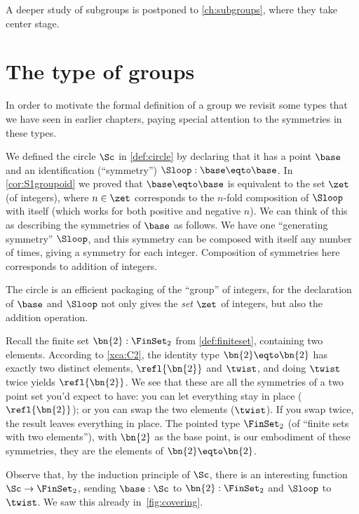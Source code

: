 A deeper study of subgroups is postponed to \cref{ch:subgroups},
where they take center stage.

\section{The type of groups}
\label{sec:typegroup}

In order to motivate the formal definition of a group we
revisit some types that we have seen in earlier chapters,
paying special attention to the symmetries in these types.
\begin{example}\label{ex:base=base}
  We defined the circle $\Sc$ in \cref{def:circle} by declaring
  that it has a point $\base$ and an identification (``symmetry'')
  $\Sloop:\base\eqto\base$.
  In \cref{cor:S1groupoid} we proved that $\base\eqto\base$ is equivalent
  to the set $\zet$ (of integers),
  where $n\in\zet$ corresponds to the $n$-fold composition of $\Sloop$ with itself
  (which works for both positive and negative $n$).
  We can think of this as describing the symmetries of $\base$ as follows.
  We have one ``generating symmetry'' $\Sloop$,
  and this symmetry can be composed with itself any number of times,
  giving a symmetry for each integer.
  Composition of symmetries here corresponds to addition of integers.

  The circle is an efficient packaging of the ``{group}'' of integers, 
  for the declaration of $\base$ and $\Sloop$ not only gives the \emph{set}
  $\zet$ of integers, but also the addition operation.
\end{example}
\begin{example}
  Recall the finite set $\bn{2}:\FinSet_2$ from \cref{def:finiteset},
  containing two elements.
  According to \cref{xca:C2}, the identity type $\bn{2} \eqto \bn{2}$ 
  has exactly two distinct elements, $\refl{\bn{2}}$ and $\twist$,
  and doing $\twist$ twice yields $\refl{\bn{2}}$.
  We see that these are all the symmetries
  of a two point set you'd expect to have:
  you can let everything stay in place ($\refl{\bn{2}}$);
  or you can swap the two elements ($\twist$).
  If you swap twice, the result leaves everything in place.
  The pointed type $\FinSet_2$ (of ``finite sets with two elements''),
  with $\bn{2}$ as the base point, is our embodiment of these symmetries, 
  \ie they are the elements of $\bn{2} \eqto \bn{2}$.

  Observe that, by the induction principle of $\Sc$,
  there is an interesting function $\Sc\to\FinSet_2$,
  sending $\base:\Sc$ to $\bn{2} :\FinSet_2$ and $\Sloop$ to $\twist$.
  We saw this already in~\cref{fig:covering}.
\end{example}

